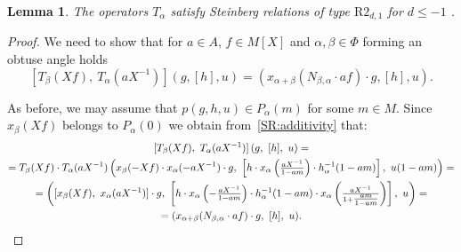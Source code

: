 \documentclass[oneside, 8pt]{amsart}
\newtheorem{lemma}{Lemma}
\theoremstyle{remark}
\theoremstyle{definition}
\numberwithin{lemma}{section}
\numberwithin{prop}{section}
\numberwithin{corollary}{section}
\numberwithin{externaltheorem}{section}
\numberwithin{equation}{section}
\begin{document}
\begin{lemma} \label{R3_leqm1_1} The operators $T_\alpha$ satisfy Steinberg relations of type $\mathrm{R2}_{d, 1}$ for $d \leq -1$ . \end{lemma}
\begin{proof} We need to show that for $a\in A$, $f \in M[X]$ and $\alpha, \beta \in \Phi$ forming an obtuse angle holds
 \[ [T_\beta(Xf),\ T_\alpha(aX^{-1})] (g, [h], u) = \left(x_{\alpha+\beta}(N_{\beta,\alpha} \cdot af) \cdot g, [h], u\right). \]

As before, we may assume that $p(g, h, u) \in P_\alpha(m)$ for some $m \in M$.
Since $x_\beta(Xf)$ belongs to $P_\alpha(0)$ we obtain from~\cref{SR:additivity} that:
\begin{multline} \nonumber [T_\beta(Xf),\ T_\alpha(aX^{-1})] \left(g,\ [h],\ u\right) = \\ 
= T_\beta(Xf) \cdot T_\alpha(aX^{-1}) \left(x_{\beta}(-Xf) \cdot x_\alpha(-aX^{-1})\cdot g,\ \left[h \cdot x_\alpha\left(\tfrac{aX^{-1}}{1 - am}\right) \cdot h^{-1}_\alpha(1-am)\right],\ u(1-am)\right) = \\ = \left([x_\beta(Xf),\ x_\alpha(aX^{-1})] \cdot g,\ \left[h \cdot x_\alpha\left(-\tfrac{aX^{-1}}{1-am}\right) \cdot h^{-1}_\alpha(1-am) \cdot x_\alpha\left(\tfrac{aX^{-1}}{1 + \tfrac{am}{1-am}}\right)\right],\ u \right) = \\ = (x_{\alpha+\beta}(N_{\beta,\alpha} \cdot af) \cdot g,\ [h],\ u). \qedhere \end{multline} \end{proof}
\end{document}
